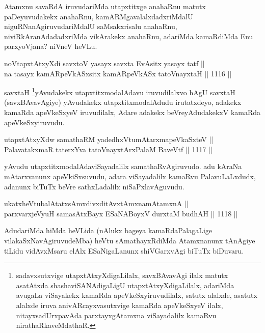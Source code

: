 \begin{artha}
Atamxnu savaRdA iruvudariMda utapxtitxge anahaRnu matutx paDeyuvudakekx anahaRnu, kamARMgavalalxdadxriMdalU niguRNanAgiruvudariMdalU saMsakxrisalu anahaRnu, niviRkAranAdadadxriMda vikArakekx anahaRnu, adariMda kamaRdiMda Enu parxyoVjana? niVneV heVLu.
\end{artha}

\begin{shl}
noVtapxtAtxyXdi savxtoV yasayx savxta EvAsitx yasayx tatf || \\
na tasayx kamARpeVkASx\s sitx kamARpeVkASx tatoV\s nayxtaH \hfill || 1116 ||  
\end{shl}

\begin{artha}
savxtaH \footnote{sadavxsutxvige utapxtAtxyXdigaLilalx, savxBAvavAgi ilalx matutx asatAtxda shashaviSANAdigaLigU utapxtAtxyXdigaLilalx, adariMda avugaLa viSayakekx kamaRda apeVkeSxyiruvudilalx, satutx alalxde, asatutx alalxde iruva anivARcayxvasutxvige kamaRda apeVkeSxyeV ilalx, nitayxsadUrxpavAda parxtayxgAtamxna viSayadalilx kamaRvu nirathaRkaveMdathaR.}yAvudakekx utapxtitxmodalAdavu iruvudilalxvo hAgU savxtaH (savxBAvavAgiye) yAvudakekx utapxtitxmodalAdudu irutatxdeyo, adakekx kamaRda apeVkeSxyeV iruvudilalx, Adare adakekx beVreyAdudakekxV kamaRda apeVkeSxyiruvudu.
\end{artha}


\begin{shl}
utapxtAtxyXdw samathaRM yadedhxVtumAtarxmapeVkaSxteV ||  \\
PalavatakxmaR taterxYva tatoV\s nayxtArxPalaM BaveVtf \hfill || 1117 ||  
\end{shl}

\begin{artha}
yAvudu utapxtitxmodalAdaviSayadalilx samathaRvAgiruvudo. adu kAraNa mAtarxvanunx 
apeVkiSxsuvudu, adara viSayadalilx kamaRvu PalavuLaLxdudx, adanunx biTuTx beVre 
sathxLadalilx niSaPxlavAguvudu.
\end{artha}

\begin{shl}
ukatxheVtubalAtatxsAmxdivxditAvx\s \s tAmxnamAtamxnA ||  \\
parxvarxjeVyuH samasAtxBayx ESaNABoyxV durxtaM budhAH \hfill || 1118 ||  
\end{shl}

\begin{artha}
AdudariMda hiMda heVLida (nAlukx bageya kamaRdaPalagaLige vilakaSxNavAgiruvudeMba) heVtu sAmathayxRdiMda Atamxnanunx tAnAgiye tiLidu vidAvxMsaru elAlx ESaNigaLanunx shiVGarxvAgi biTuTx biDuvaru.
\end{artha}


